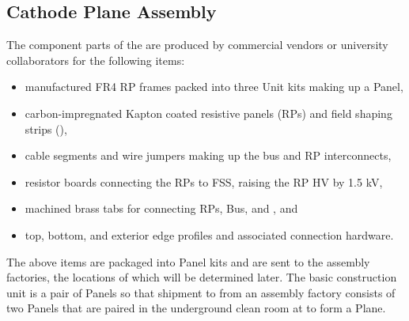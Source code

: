 \subsection{Cathode Plane Assembly}
\label{sec:fdsp-hv-prod-cpa}
The component parts of the  %
are produced by commercial vendors or university collaborators for the following items:
\begin{itemize}
\item manufactured FR4 RP frames packed into three  Unit kits making up a  Panel,
\item carbon-impregnated Kapton coated resistive panels (RPs) and field shaping strips (),
\item {} cable segments and wire jumpers making up the   bus and RP interconnects,
\item resistor boards connecting the RPs to FSS, raising the RP HV by 1.5 kV,
\item machined brass tabs for connecting RPs,  Bus, and , and
\item top, bottom, and exterior edge profiles and associated connection hardware.
\end{itemize}
The above items are packaged into  Panel kits and are sent to the assembly factories, the locations of which will be determined later.  The basic construction unit is a pair of  Panels so that shipment to \surf from an assembly factory consists of two  Panels that are paired in the underground clean room at \surf to form a  Plane.

